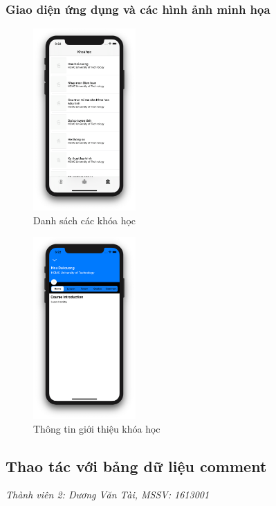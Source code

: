 \documentclass[12pt,a4paper,titlepage]{article}
\begin{document}
\subsubsection{Giao diện ứng dụng và các hình ảnh minh họa}
\begin{figure}[h!]
	\centering
	\caption{Danh sách các khóa học}
	\includegraphics[width=0.35\textwidth]{images/course1.png}
\end{figure}
\newpage
\begin{figure}[h!]
	\centering
	\caption{Thông tin giới thiệu khóa học}
	\includegraphics[width=0.35\textwidth]{images/course2.png}
\end{figure}
\newpage
\subsection{Thao tác với bảng dữ liệu comment}
\textit{Thành viên 2: Dương Văn Tài, MSSV: 1613001}
\end{document}

